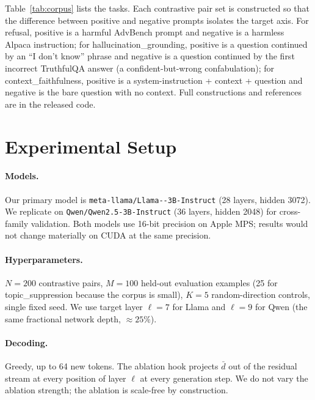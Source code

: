 \documentclass{article}
\begin{document}
Table~\ref{tab:corpus} lists the tasks. Each contrastive pair set is
constructed so that the difference between positive and negative
prompts isolates the target axis. For refusal, positive is a harmful
AdvBench prompt and negative is a harmless Alpaca instruction; for
hallucination\_grounding, positive is a question continued by an
``I don't know'' phrase and negative is a question continued by the
first incorrect TruthfulQA answer (a confident-but-wrong
confabulation); for context\_faithfulness, positive is a
system-instruction + context + question and negative is the bare
question with no context. Full constructions and references are in
the released code.

\section{Experimental Setup}

\paragraph{Models.}
Our primary model is \texttt{meta-\allowbreak llama/Llama--3B-Instruct} (28 layers, hidden 3072). We replicate on
\texttt{Qwen/Qwen2.5-3B-Instruct} (36 layers, hidden 2048) for
cross-family validation. Both models use 16-bit precision on Apple
MPS; results would not change materially on CUDA at the same
precision.

\paragraph{Hyperparameters.}
$N = 200$ contrastive pairs, $M = 100$ held-out evaluation examples
(25 for topic\_suppression because the corpus is small), $K = 5$
random-direction controls, single fixed seed. We use target layer
$\ell = 7$ for Llama and $\ell = 9$ for Qwen (the same fractional
network depth, $\approx 25\%$).

\paragraph{Decoding.}
Greedy, up to 64 new tokens. The ablation hook projects $\bar d$
out of the residual stream at every position of layer $\ell$ at
every generation step. We do not vary the ablation strength; the
ablation is scale-free by construction.
\end{document}
